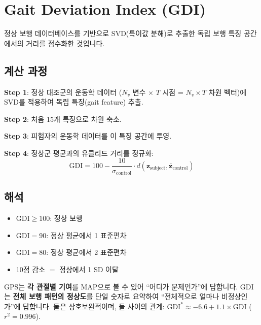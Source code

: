 \documentclass[11pt, a4paper]{report}
\begin{document}
\section{Gait Deviation Index (GDI)}

\begin{definition}
정상 보행 데이터베이스를 기반으로 SVD(특이값 분해)로 추출한 독립 보행 특징 공간에서의 거리를 점수화한 것입니다.
\end{definition}

\subsection{계산 과정}

\textbf{Step 1}: 정상 대조군의 운동학 데이터 ($N_v$ 변수 $\times$ $T$ 시점 = $N_v \times T$ 차원 벡터)에 SVD를 적용하여 독립 특징(gait feature) 추출.

\textbf{Step 2}: 처음 15개 특징으로 차원 축소.

\textbf{Step 3}: 피험자의 운동학 데이터를 이 특징 공간에 투영.

\textbf{Step 4}: 정상군 평균과의 유클리드 거리를 정규화:
\begin{equation}
\text{GDI} = 100 - \frac{10}{\sigma_{\text{control}}} \cdot d(\mathbf{z}_{\text{subject}}, \bar{\mathbf{z}}_{\text{control}})
\label{eq:gdi}
\end{equation}

\subsection{해석}

\begin{itemize}[leftmargin=*]
  \item $\text{GDI} \geq 100$: 정상 보행
  \item $\text{GDI} = 90$: 정상 평균에서 1 표준편차
  \item $\text{GDI} = 80$: 정상 평균에서 2 표준편차
  \item 10점 감소 $=$ 정상에서 1 SD 이탈
\end{itemize}

\begin{clinicalnote}
GPS는 \textbf{각 관절별 기여}를 MAP으로 볼 수 있어 ``어디가 문제인가''에 답합니다. GDI는 \textbf{전체 보행 패턴의 정상도}를 단일 숫자로 요약하여 ``전체적으로 얼마나 비정상인가''에 답합니다. 둘은 상호보완적이며, 둘 사이의 관계: $\text{GDI}^* \approx -6.6 + 1.1 \times \text{GDI}$ ($r^2 = 0.996$).
\end{clinicalnote}
\end{document}
